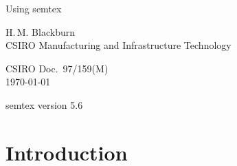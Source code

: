 \documentclass[11pt,a4paper]{report}
\begin{document}
\begin{titlepage}
\centering

\vspace*{\fill}

{\huge Using {\sffamily semtex}}

\vspace{\fill}

\begin{figure}[h]
\begin{center}
\end{center}
\end{figure}

\vspace{\fill}

{\large H.\,M. Blackburn}\\
CSIRO Manufacturing and Infrastructure Technology\\

\vspace{\fill}

{\large CSIRO Doc.\ 97/159(M)}\\
\today

\textsf{semtex} version 5.6

\vspace*{\fill}

\end{titlepage}


\tableofcontents

\clearpage

\chapter{Introduction}
\end{document}
